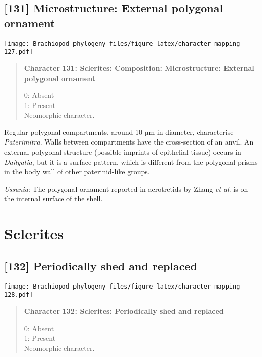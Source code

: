 \documentclass[openany]{book}
\theoremstyle{definition}
\theoremstyle{definition}
\theoremstyle{definition}
\theoremstyle{remark}
\begin{document}
\subsection*{{[}131{]} Microstructure: External polygonal
ornament}\label{microstructure-external-polygonal-ornament}

\texttt{[image: Brachiopod\_phylogeny\_files/figure-latex/character-mapping-127.pdf]}

\begin{quote}
\textbf{Character 131: Sclerites: Composition: Microstructure: External
polygonal ornament}

0: Absent\\
1: Present\\
Neomorphic character.
\end{quote}

Regular polygonal compartments, around 10 µm in diameter, characterise
\emph{Paterimitra}. Walls between compartments have the cross-section of
an anvil. An external polygonal structure (possible imprints of
epithelial tissue) occurs in \emph{Dailyatia}, but it is a surface
pattern, which is different from the polygonal prisms in the body wall
of other paterinid-like groups.

\hypertarget{Ussunia-coding-131}{}
\emph{Ussunia}: The polygonal ornament reported in acrotretids by Zhang
\emph{et al}. \citeyearpar{Zhang2016Epithelialcell} is on the internal
surface of the shell.

\section{Sclerites}\label{sclerites-1}

\subsection*{{[}132{]} Periodically shed and
replaced}\label{periodically-shed-and-replaced}

\texttt{[image: Brachiopod\_phylogeny\_files/figure-latex/character-mapping-128.pdf]}

\begin{quote}
\textbf{Character 132: Sclerites: Periodically shed and replaced}

0: Absent\\
1: Present\\
Neomorphic character.
\end{quote}
\end{document}
